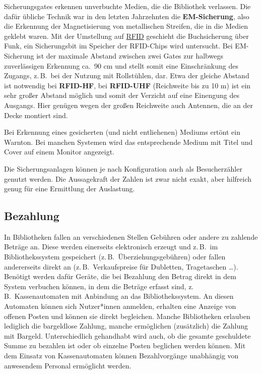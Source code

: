 \documentclass[
  11pt,
  letterpaper,
  DIV=11,
  twoside]{scrreprt}
\begin{document}
Sicherungsgates erkennen unverbuchte Medien, die die Bibliothek
verlassen. Die dafür übliche Technik war in den letzten Jahrzehnten die
\textbf{EM-Sicherung}, also die Erkennung der Magnetisierung von
metallischen Streifen, die in die Medien geklebt waren. Mit der
Umstellung auf \hyperref[rfid]{RFID} geschieht die Buchsicherung über
Funk, ein Sicherungsbit im Speicher der RFID-Chips wird untersucht. Bei
EM-Sicherung ist der maximale Abstand zwischen zwei Gates zur halbwegs
zuverlässigen Erkennung ca.~90 cm und stellt somit eine Einschränkung
des Zugangs, z.\,B.~bei der Nutzung mit Rollstühlen, dar. Etwa der
gleiche Abstand ist notwendig bei \textbf{RFID-HF}, bei
\textbf{RFID-UHF} (Reichweite bis zu 10 m) ist ein sehr großer Abstand
möglich und somit der Verzicht auf eine Einengung des Ausgangs. Hier
genügen wegen der großen Reichweite auch Antennen, die an der Decke
montiert sind.

Bei Erkennung eines gesicherten (und nicht entliehenen) Mediums ertönt
ein Warnton. Bei manchen Systemen wird das entsprechende Medium mit
Titel und Cover auf einem Monitor angezeigt.

Die Sicherungsanlagen können je nach Konfiguration auch als
Besucherzähler genutzt werden. Die Aussagekraft der Zahlen ist zwar
nicht exakt, aber hilfreich genug für eine Ermittlung der Auslastung.

\subsection{Bezahlung}\label{bezahlung}

In Bibliotheken fallen an verschiedenen Stellen Gebühren oder andere zu
zahlende Beträge an. Diese werden einerseits elektronisch erzeugt und
z.\,B.~im Bibliothekssystem gespeichert (z.\,B.~Überziehungsgebühren)
oder fallen andererseits direkt an (z.\,B.~Verkaufspreise für Dubletten,
Tragetaschen \ldots). Benötigt werden dafür Geräte, die bei Bezahlung
den Betrag direkt in dem System verbuchen können, in dem die Beträge
erfasst sind, z.\,B.~Kassenautomaten mit Anbindung an das
Bibliothekssystem. An diesen Automaten können sich Nutzer*innen
anmelden, erhalten eine Anzeige von offenen Posten und können sie direkt
begleichen. Manche Bibliotheken erlauben lediglich die bargeldlose
Zahlung, manche ermöglichen (zusätzlich) die Zahlung mit Bargeld.
Unterschiedlich gehandhabt wird auch, ob die gesamte geschuldete Summe
zu bezahlen ist oder ob einzelne Posten beglichen werden können. Mit dem
Einsatz von Kassenautomaten können Bezahlvorgänge unabhängig von
anwesendem Personal ermöglicht werden.
\end{document}
